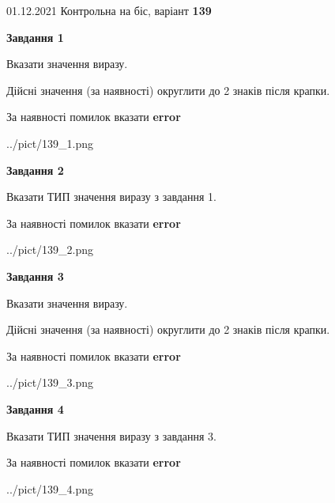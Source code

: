 \documentclass[11pt, ukrainian]{article}
\begin{document}
{01.12.2021 Контрольна на біс, варіант  \No \textbf { 139 }\par}
{
\begin {large}
{\begin {center}\textbf{Завдання 1}\end {center}}\par
Вказати значення виразу. \par
Дійсні значення (за наявності) округлити до 2 знаків після крапки. \par
За наявності помилок вказати \textbf{error}

\begin{center}
	{../pict/139_1.png}
\end{center}
\newpage

{\begin {center}\textbf{Завдання 2}\end {center}}\par
Вказати ТИП значення виразу з завдання 1. \par
За наявності помилок вказати \textbf{error}

\begin{center}
	{../pict/139_2.png}
\end{center}
\newpage

{\begin {center}\textbf{Завдання 3}\end {center}}\par
Вказати значення виразу. \par
Дійсні значення (за наявності) округлити до 2 знаків після крапки. \par
За наявності помилок вказати \textbf{error}

\begin{center}
	{../pict/139_3.png}
\end{center}
\newpage

{\begin {center}\textbf{Завдання 4}\end {center}}\par
Вказати ТИП значення виразу з завдання 3. \par
За наявності помилок вказати \textbf{error}

\begin{center}
	{../pict/139_4.png}
\end{center}
\newpage


\end{large}}
\end{document}

